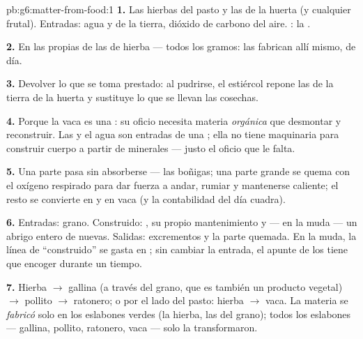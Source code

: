 \begin{solution}{pb:g6:matter-from-food:1}
\textbf{1.} Las hierbas del pasto y las  de la huerta (y
cualquier frutal). Entradas: agua y  de la tierra,
dióxido de carbono del aire. : la .

\textbf{2.} En las propias  de las  de hierba --- todos los
gramos: las  fabrican allí mismo, de día.

\textbf{3.} Devolver lo que se toma prestado: al pudrirse, el estiércol
repone las  de la tierra de la huerta y sustituye lo que
se llevan las cosechas.

\textbf{4.} Porque la vaca es una : su oficio necesita
materia \emph{orgánica} que desmontar y reconstruir. Las  y el agua son entradas de una ; ella no tiene
maquinaria para construir cuerpo a partir de minerales --- justo el
oficio que le falta.

\textbf{5.} Una parte pasa sin absorberse --- las boñigas; una parte
grande se quema con el oxígeno respirado para dar fuerza a andar,
rumiar y mantenerse caliente; el resto se convierte en  y en vaca
(y la contabilidad del día cuadra).

\textbf{6.} Entradas: grano. Construido: , su propio
mantenimiento y --- en la muda --- un abrigo entero de  nuevas.
Salidas: excrementos y la parte quemada. En la muda, la línea de
``construido'' se gasta en ; sin cambiar la entrada, el apunte de
los  tiene que encoger durante un tiempo.

\textbf{7.} Hierba $\rightarrow$ gallina (a través del grano, que es
también un producto vegetal) $\rightarrow$ pollito $\rightarrow$
ratonero; o por el lado del pasto: hierba $\rightarrow$ vaca. La
materia se \emph{fabricó} solo en los eslabones verdes (la hierba, las
 del grano); todos los eslabones  --- gallina, pollito,
ratonero, vaca --- solo la transformaron.


\end{solution}
